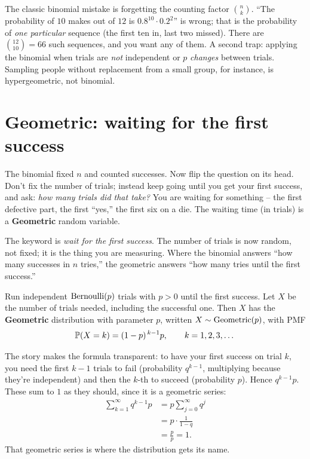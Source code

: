 \begin{trapbox}
The classic binomial mistake is forgetting the counting factor $\binom{n}{k}$.
``The probability of $10$ makes out of $12$ is $0.8^{10} \cdot 0.2^2$'' is wrong;
that is the probability of \emph{one particular} sequence (the first ten in, last
two missed). There are $\binom{12}{10} = 66$ such sequences, and you want any of
them. A second trap: applying the binomial when trials are \emph{not}
independent or $p$ \emph{changes} between trials. Sampling people without
replacement from a small group, for instance, is hypergeometric, not binomial.
\end{trapbox}

\section{Geometric: waiting for the first success}
\label{ch07:geometric}

The binomial fixed $n$ and counted successes. Now flip the question on its head.
Don't fix the number of trials; instead keep going until you get your first
success, and ask: \emph{how many trials did that take?} You are waiting for
something -- the first defective part, the first ``yes,'' the first six on a die.
The waiting time (in trials) is a \textbf{Geometric} random variable.

\begin{intuitionbox}
The keyword is \emph{wait for the first success}. The number of trials is now
random, not fixed; it is the thing you are measuring. Where the binomial answers
``how many successes in $n$ tries,'' the geometric answers ``how many tries until
the first success.''
\end{intuitionbox}

\begin{definition}
\label{ch07:def-geometric}
Run independent $\Bern(p)$ trials with $p > 0$ until the first success. Let $X$ be
the number of trials needed, including the successful one. Then $X$ has the
\textbf{Geometric} distribution with parameter $p$, written $X \sim \Geom(p)$,
with PMF
\[
  \P(X = k) = (1-p)^{\,k-1} p, \qquad k = 1, 2, 3, \dots
\]
\end{definition}

The story makes the formula transparent: to have your first success on trial $k$,
you need the first $k-1$ trials to fail (probability $q^{k-1}$, multiplying
because they're independent) and then the $k$-th to succeed (probability $p$).
Hence $q^{k-1} p$. These sum to $1$ as they should, since it is a geometric series:
\begin{align*}
  \sum_{k=1}^{\infty} q^{k-1} p &= p \sum_{j=0}^{\infty} q^{j} \\
  &= p \cdot \frac{1}{1-q} \\
  &= \frac{p}{p} = 1.
\end{align*}
That geometric series is where the distribution gets its name.

